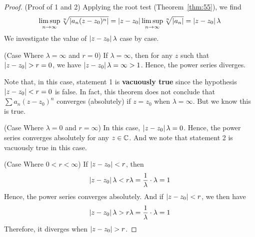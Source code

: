 \documentclass[thmcnt=section, 12pt]{my-elegantbook}
\begin{document}
\begin{proof}
    (Proof of 1 and 2) Applying the root test (Theorem~\ref{thm:55}), we find
    \begin{align*}
        \limsup_{n \to \infty} \sqrt[n]{\left\lvert a_n(z - z_0)^n \right\rvert}
        = \left\lvert z - z_0 \right\rvert \limsup_{n \to \infty} \sqrt[n]{\left\lvert a_n \right\rvert}
        = \left\lvert z - z_0 \right\rvert \lambda
    \end{align*}
    We investigate the value of $\left\lvert z - z_0 \right\rvert \lambda$ case by case.

    (Case Where $\lambda = \infty$ and $r = 0$) If $\lambda = \infty$, then for any $z$ such that $\left\lvert z - z_0 \right\rvert > r = 0$, we have $\left\lvert z - z_0 \right\rvert \lambda = \infty > 1$. Hence, the power series diverges.
    \begin{note}
        Note that, in this case, statement 1 is \textbf{vacuously true} since the hypothesis $\left\lvert z - z_0 \right\rvert < r = 0$ is false. In fact, this theorem does not conclude that $\sum a_n (z-z_0)^n$ converges (absolutely) if $z = z_0$ when $\lambda = \infty$. But we know this is true.
    \end{note}

    (Case Where $\lambda = 0$ and $r = \infty$) In this case, $\left\lvert z - z_0 \right\rvert \lambda = 0$. Hence, the power series converges absolutely for any $z \in \mathbb{C}$. And we note that statement 2 is vacuously true in this case.

    (Case Where $0 < r < \infty$) If $\left\lvert z-z_0 \right\rvert < r$, then
    \begin{align*}
        \left\lvert z - z_0 \right\rvert \lambda
        < r \lambda
        = \frac{1}{\lambda} \cdot \lambda
        = 1
    \end{align*}
    Hence, the power series converges absolutely. And if $\left\lvert z-z_0 \right\rvert < r$, we then have
    \begin{align*}
        \left\lvert z - z_0 \right\rvert \lambda
        > r \lambda
        = \frac{1}{\lambda} \cdot \lambda
        = 1
    \end{align*}
    Therefore, it diverges when $\left\lvert z - z_0 \right\rvert > r$.


\end{proof}
\end{document}

